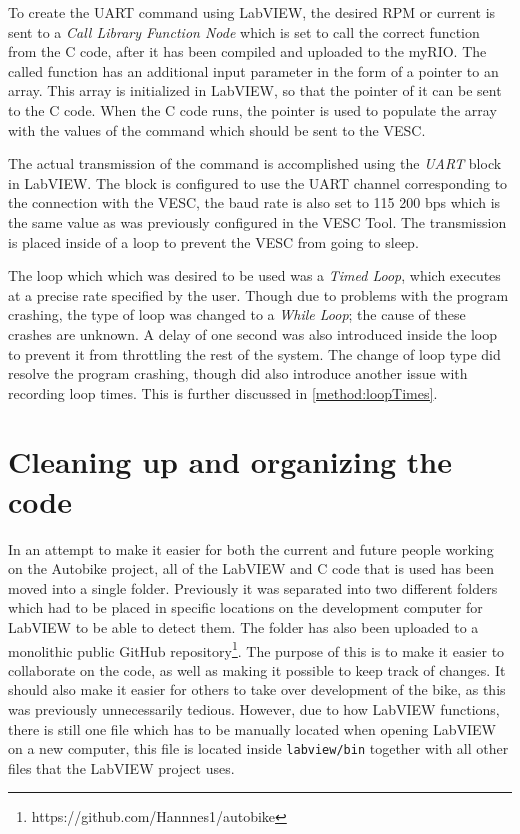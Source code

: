 To create the UART command using LabVIEW, the desired RPM or current is sent to a \textit{Call Library Function Node} which is set to call the correct function from the C code, after it has been compiled and uploaded to the myRIO. The called function has an additional input parameter in the form of a pointer to an array. This array is initialized in LabVIEW, so that the pointer of it can be sent to the C code. When the C code runs, the pointer is used to populate the array with the values of the command which should be sent to the VESC. 

The actual transmission of the command is accomplished using the \textit{UART} block in LabVIEW. The block is configured to use the UART channel corresponding to the connection with the VESC, the baud rate is also set to 115 200 bps which is the same value as was previously configured in the VESC Tool. The transmission is placed inside of a loop to prevent the VESC from going to sleep.

The loop which which was desired to be used was a \textit{Timed Loop}, which executes at a precise rate specified by the user. Though due to problems with the program crashing, the type of loop was changed to a \textit{While Loop}; the cause of these crashes are unknown. A delay of one second was also introduced inside the loop to prevent it from throttling the rest of the system. The change of loop type did resolve the program crashing, though did also introduce another issue with recording loop times. This is further discussed in \ref{method:loopTimes}.

\section{Cleaning up and organizing the code}

In an attempt to make it easier for both the current and future people working on the Autobike project, all of the LabVIEW and C code that is used has been moved into a single folder. Previously it was separated into two different folders which had to be placed in specific locations on the development computer for LabVIEW to be able to detect them. The folder has also been uploaded to a monolithic public GitHub repository\footnote{https://github.com/Hannnes1/autobike}. The purpose of this is to make it easier to collaborate on the code, as well as making it possible to keep track of changes. It should also make it easier for others to take over development of the bike, as this was previously unnecessarily tedious. However, due to how LabVIEW functions, there is still one file which has to be manually located when opening LabVIEW on a new computer, this file is located inside \texttt{labview/bin} together with all other files that the LabVIEW project uses.

